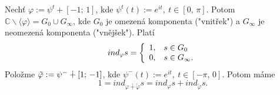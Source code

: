 \begin{example}
Nechť $\varphi:=\psi^t+[-1;\,1]$, kde $\psi^t(t):=e^{it},\ t\in[0,\,\pi]$. Potom $\mathbb{C}\backslash\langle{\varphi}\rangle=G_0\cup{G_\infty}$, kde $G_0$ je omezená komponenta ("vnitřek") a $G_\infty$ je neomezená komponenta ("vnějšek"). Platí
$${ind}_\varphi{s}=
\left\{
\begin{array}{ll}
1, \hspace{3mm} s\in{G_0}\\
0, \hspace{3mm} s\in{G_\infty}.
\end{array}
\right.$$
Položme $\Tilde{\varphi}:=\psi^-\dotplus[1;\,-1]$,
kde $\psi^-(t):=e^{it},\ t\in[-\pi,\,0]$. Potom máme 
$$1={ind}_{\varphi\dotplus\tilde\varphi}{s}={ind}_\varphi{s}+{ind}_{\tilde{\varphi}}{s}.$$
\end{example}

